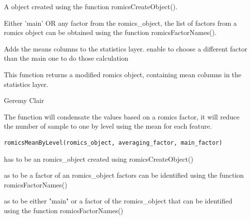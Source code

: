 \documentclass[a4paper]{book}
\begin{document}
%
\begin{Arguments}
\begin{ldescription}
\item[\code{romics\_object}] A object created using the function romicsCreateObject().

\item[\code{main\_factor}] Either 'main' OR any factor from the romics\_object, the list of factors from a romics object can be obtained using the function romicsFactorNames().
\end{ldescription}
\end{Arguments}
%
\begin{Details}
Adds the means columns to the statistics layer. enable to choose a different factor than the main one to do those calculation
\end{Details}
%
\begin{Value}
This function returns a modified romics object, containing mean columns in the statistics layer.
\end{Value}
%
\begin{Author}
Geremy Clair
\end{Author}
%
\begin{Description}
The function will condensate the values based on a romics factor, it will reduce the number of sample to one by level using the mean for each feature.
\end{Description}
%
\begin{Usage}
\begin{verbatim}
romicsMeanByLevel(romics_object, averaging_factor, main_factor)
\end{verbatim}
\end{Usage}
%
\begin{Arguments}
\begin{ldescription}
\item[\code{romics\_object}] has to be an romics\_object created using romicsCreateObject()

\item[\code{averaging\_factor}] as to be a factor of an romics\_object factors can be identified using the function romicsFactorNames()

\item[\code{main\_factor}] as to be either "main" or a factor of the romics\_object that can be identified using the function romicsFactorNames()
\end{ldescription}
\end{Arguments}
\end{document}
